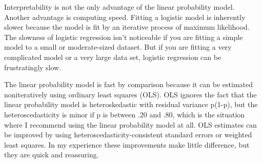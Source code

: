 \documentclass[sigconf]{acmart}
\begin{document}
\par
Interpretability is not the only advantage of the linear probability model. Another advantage is computing speed. Fitting a logistic model is inherently slower because the model is fit by an iterative process of maximum likelihood. The slowness of logistic regression isn’t noticeable if you are fitting a simple model to a small or moderate-sized dataset. But if you are fitting a very complicated model or a very large data set, logistic regression can be frustratingly slow.

\par
The linear probability model is fast by comparison because it can be estimated noniteratively using ordinary least squares (OLS). OLS ignores the fact that the linear probability model is heteroskedastic with residual variance p(1-p), but the heteroscedasticity is minor if p is between .20 and .80, which is the situation where I recommend using the linear probability model at all. OLS estimates can be improved by using heteroscedasticity-consistent standard errors or weighted least squares. In my experience these improvements make little difference, but they are quick and reassuring.


 
\end{document}
